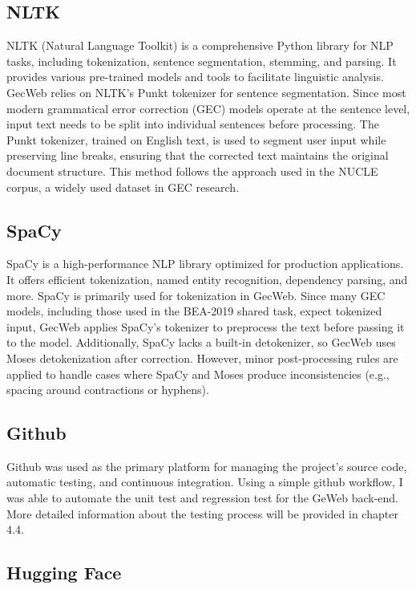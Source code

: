 \subsection{NLTK}

NLTK (Natural Language Toolkit) is a comprehensive Python library for NLP tasks, including tokenization, sentence segmentation, stemming, and parsing.
It provides various pre-trained models and tools to facilitate linguistic analysis.
GecWeb relies on NLTK's Punkt tokenizer for sentence segmentation.
Since most modern grammatical error correction (GEC) models operate at the sentence level, input text needs to be split into individual sentences before processing.
The Punkt tokenizer, trained on English text, is used to segment user input while preserving line breaks, ensuring that the corrected text maintains the original document structure.
This method follows the approach used in the NUCLE corpus, a widely used dataset in GEC research.

\subsection{SpaCy}

SpaCy is a high-performance NLP library optimized for production applications.
It offers efficient tokenization, named entity recognition, dependency parsing, and more.
SpaCy is primarily used for tokenization in GecWeb.
Since many GEC models, including those used in the BEA-2019 shared task, expect tokenized input, GecWeb applies SpaCy's tokenizer to preprocess the text before passing it to the model.
Additionally, SpaCy lacks a built-in detokenizer, so GecWeb uses Moses detokenization after correction.
However, minor post-processing rules are applied to handle cases where SpaCy and Moses produce inconsistencies (e.g., spacing around contractions or hyphens).

\subsection{Github}
\label{github}

Github was used as the primary platform for managing the project's source code, automatic testing, and continuous integration.
Using a simple github workflow, I was able to automate the unit test and regression test for the GeWeb back-end.
More detailed information about the testing process will be provided in chapter 4.4.

\subsection{Hugging Face}
\label{hugging-face}

